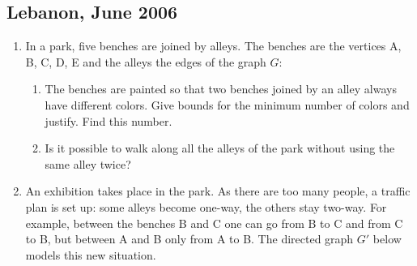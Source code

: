 \subsection{Lebanon, June 2006}\label{lib06}
\begin{enumerate}
\item In a park, five benches are joined by alleys. The benches are the
      vertices A, B, C, D, E and the alleys the edges of the graph $G$:

\begin{center}
\end{center}

   \begin{enumerate}
   \item The benches are painted so that two benches joined by an alley
         always have different colors. Give bounds for the minimum number of
         colors and justify. Find this number.
   \item Is it possible to walk along all the alleys of the park without
         using the same alley twice?
   \end{enumerate}
\item An exhibition takes place in the park. As there are too many people,
      a traffic plan is set up: some alleys become one-way, the others stay
      two-way. For example, between the benches B and C one can go from B to
      C and from C to B, but between A and B only from A to B. The directed
      graph $G'$ below models this new situation.

\begin{center}
\end{center}


\end{enumerate}
